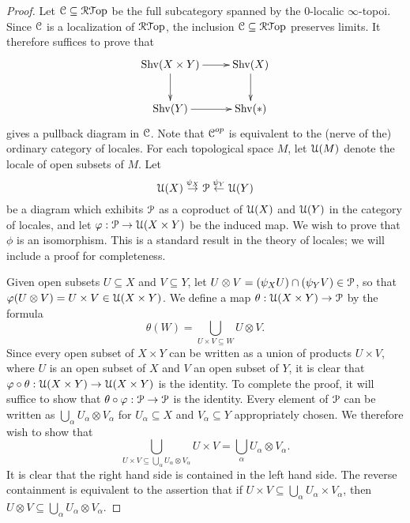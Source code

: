 \begin{proof}
Let $\operatorname{\mathcal{C}} \subseteq \operatorname{\mathcal{R}{\mathcal T}op}$ be the full subcategory spanned by the $0$-localic $\infty$-topoi. Since $\operatorname{\mathcal{C}}$ is a localization of $\operatorname{\mathcal{R}{\mathcal T}op}$, the inclusion $\operatorname{\mathcal{C}} \subseteq \operatorname{\mathcal{R}{\mathcal T}op}$ preserves limits. It therefore suffices to prove that
$$ \xymatrix{ \Shv(X \times Y) \ar[r] \ar[d] & \Shv(X) \ar[d] \\
\Shv(Y) \ar[r] & \Shv(\ast) }$$
gives a pullback diagram in $\operatorname{\mathcal{C}}$. Note that $\operatorname{\mathcal{C}}^{op}$ is equivalent to the (nerve of the) ordinary category of locales. For each topological space $M$, let $\operatorname{\mathcal{U}}(M)$ denote the locale of open subsets of $M$. Let
$$ \operatorname{\mathcal{U}}(X) \stackrel{\psi_X}{\rightarrow} \operatorname{\mathcal{P}} \stackrel{\psi_{Y}}{\leftarrow} \operatorname{\mathcal{U}}(Y)$$
be a diagram which exhibits $\operatorname{\mathcal{P}}$ as a coproduct of $\operatorname{\mathcal{U}}(X)$ and $\operatorname{\mathcal{U}}(Y)$ in the category of locales, and let $\varphi: \operatorname{\mathcal{P}} \rightarrow \operatorname{\mathcal{U}}(X \times Y)$ be the induced map. We wish to prove that $\phi$ is an isomorphism. This is a standard result in the theory of locales; we will include a proof for completeness.

Given open subsets $U \subseteq X$ and $V \subseteq Y$, let
$U \otimes V = ( \psi_{X} U) \cap (\psi_Y V) \in \operatorname{\mathcal{P}}$, so that
$\varphi(U \otimes V) = U \times V \in \operatorname{\mathcal{U}}(X \times Y)$. We define a map
$\theta: \operatorname{\mathcal{U}}(X \times Y) \rightarrow \operatorname{\mathcal{P}}$ by the formula
$$ \theta(W) = \bigcup_{ U \times V \subseteq W } U \otimes V.$$
Since every open subset of $X \times Y$ can be written as a union of products $U \times V$, where $U$ is an open subset of $X$ and $V$ an open subset of $Y$, it is clear that
$\varphi \circ \theta: \operatorname{\mathcal{U}}( X \times Y) \rightarrow \operatorname{\mathcal{U}}(X \times Y)$ is the identity.
To complete the proof, it will suffice to show that $\theta \circ \varphi: \operatorname{\mathcal{P}} \rightarrow \operatorname{\mathcal{P}}$ is the identity. Every element of $\operatorname{\mathcal{P}}$ can be written as $\bigcup_{\alpha} U_{\alpha} \otimes V_{\alpha}$ for $U_{\alpha} \subseteq X$ and $V_{\alpha} \subseteq Y$ appropriately chosen.
We therefore wish to show that
$$ \bigcup_{ U \times V \subseteq \bigcup_{\alpha} U_{\alpha} \otimes V_{\alpha}} U \times V = \bigcup_{\alpha} U_{\alpha} \otimes V_{\alpha}.$$
It is clear that the right hand side is contained in the left hand side. The reverse containment is equivalent to the assertion that if $U \times V \subseteq \bigcup_{\alpha} U_{\alpha} \times V_{\alpha}$, then $U \otimes V \subseteq \bigcup_{\alpha} U_{\alpha} \otimes V_{\alpha}$.


\end{proof}
